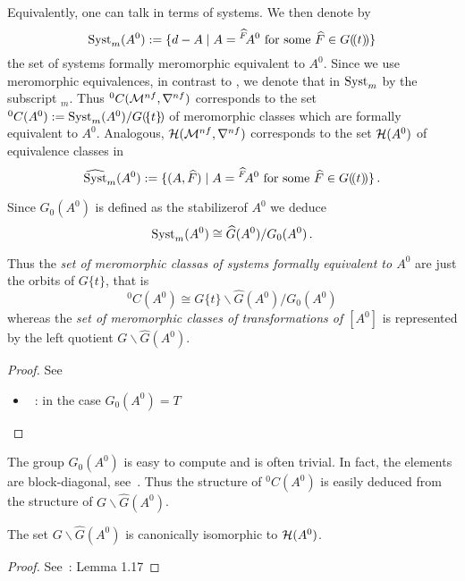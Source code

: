 Equivalently, one can talk in terms of systems. We then denote by
\[
  \operatorname{Syst}_m(A^0):=\{d-A
    \mid A={}^{\widehat F}\!A^0 \text{ for some } \widehat F\in G(\!(t)\!)\}
\]
the set of systems formally meromorphic equivalent to $A^0$.
Since we use meromorphic equivalences, in contrast to \cite{boalch,thboalch},
we denote that in $\operatorname{Syst}_m$ by the subscript ${}_m$.
Thus ${}^0C(\mathcal{M}^{nf},\nabla^{nf})$ corresponds to
the set ${}^0C(A^0):=\operatorname{Syst}_m(A^0)/G(\!\{t\}\!)$ of meromorphic classes which
are formally equivalent to $A^0$.
Analogous, $\mathcal{H}(\mathcal{M}^{nf},\nabla^{nf})$ corresponds to the set $\mathcal{H}(A^0)$ of
equivalence classes in
\[
  \widehat{\operatorname{Syst}}_m(A^0):=\{(A,\widehat F)
    \mid A={}^{\widehat F}\!A^0 \text{ for some } \widehat F\in G(\!(t)\!)\} \,.
\]

\begin{lem}
  Since $G_0(A^0)$ is defined as the stabilizer\TODO[correct?] of $A^0$ we deduce
  \[
    \operatorname{Syst}_m(A^0)\cong \widehat G(A^0)/G_0(A^0) \,.
  \]
  \begin{s-cor}
    Thus the \emph{set of meromorphic classas of systems formally equivalent
      to $A^0$} are just the orbits of $G\{t\}$, that is
    \[
      {}^0C(A^0)\cong G\{t\}\backslash\hat G(A^0)/G_0(A^0)
    \]
    whereas the \emph{set of meromorphic classes of transformations of $[A^0]$}
    is represented by the left quotient $G\backslash\hat G(A^0)$.
  \end{s-cor}
\end{lem}
\begin{proof}
  See
  \begin{itemize}
    \item~\cite[6]{thboalch}: in the case $G_0(A^0)=T$
  \end{itemize}
\end{proof}

The group $G_0(A^0)$ is easy to compute and is often trivial. In fact, the
elements are block-diagonal, see~\cite[77]{Loday2014}.
Thus the structure of ${}^0C(A^0)$ is easily deduced from the structure of
$G\backslash\hat G(A^0)$.

\begin{lem}
  The set $G\backslash\hat G(A^0)$ is canonically isomorphic to $\mathcal{H}(A^0)$.
\end{lem}
\begin{proof}
  See~\cite{thboalch}: Lemma 1.17
\end{proof}

